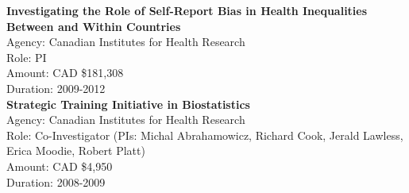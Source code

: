 \documentclass[
  letterpaper,
  DIV=11,
  numbers=noendperiod]{scrartcl}
\begin{document}
\textbf{Investigating the Role of Self-Report Bias in Health
Inequalities Between and Within Countries}\\
\hspace*{0.333em}\hspace*{0.333em}\hspace*{0.333em}\hspace*{0.333em}Agency:
Canadian Institutes for Health Research\\
\hspace*{0.333em}\hspace*{0.333em}\hspace*{0.333em}\hspace*{0.333em}Role:
PI\\
\hspace*{0.333em}\hspace*{0.333em}\hspace*{0.333em}\hspace*{0.333em}Amount:
CAD \$181,308\\
\hspace*{0.333em}\hspace*{0.333em}\hspace*{0.333em}\hspace*{0.333em}Duration:
2009-2012\\

\textbf{Strategic Training Initiative in Biostatistics}\\
\hspace*{0.333em}\hspace*{0.333em}\hspace*{0.333em}\hspace*{0.333em}Agency:
Canadian Institutes for Health Research\\
\hspace*{0.333em}\hspace*{0.333em}\hspace*{0.333em}\hspace*{0.333em}Role:
Co-Investigator (PIs: Michal Abrahamowicz, Richard Cook, Jerald Lawless,
Erica Moodie, Robert Platt)\\
\hspace*{0.333em}\hspace*{0.333em}\hspace*{0.333em}\hspace*{0.333em}Amount:
CAD \$4,950\\
\hspace*{0.333em}\hspace*{0.333em}\hspace*{0.333em}\hspace*{0.333em}Duration:
2008-2009\\
\end{document}
